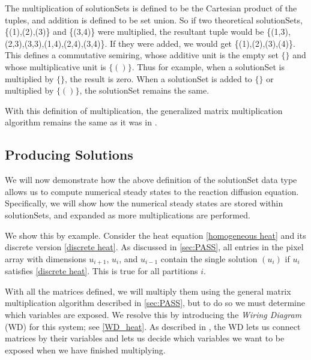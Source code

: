 \documentclass[11pt]{article}
\begin{document}
The multiplication of solutionSets is defined to be the Cartesian product of the tuples, and addition is defined to be set union. So if two theoretical solutionSets, \{(1),(2),(3)\} and \{(3,4)\} were multiplied, the resultant tuple would be \{(1,3),(2,3),(3,3),(1,4),(2,4),(3,4)\}. If they were added, we would get \{(1),(2),(3),(4)\}. This defines a commutative semiring, whose additive unit is the empty set $\{\}$ and whose multiplicative unit is $\{()\}$. Thus for example, when a solutionSet is multiplied by $\{\}$, the result is zero. When a solutionSet is added to $\{\}$ or multiplied by $\{()\}$, the solutionSet remains the same.

With this definition of multiplication, the generalized matrix multiplication algorithm remains the same as it was in \citep{Introduction_to_PA}.

\subsection{Producing Solutions}

We will now demonstrate how the above definition of the solutionSet data type allows us to compute numerical steady states to the reaction diffusion equation. Specifically, we will show how the numerical steady states are stored within solutionSets, and expanded as more multiplications are performed. 

We show this by example. Consider the heat equation \eqref{homogeneous heat} and its discrete version \eqref{discrete heat}. As discussed in \cref{sec:PASS}, all entries in the pixel array with dimensions $u_{i+1}$, $u_i$, and $u_{i-1}$ contain the single solution ${(u_i)}$ if $u_i$ satisfies \cref{discrete heat}. This is true for all partitions $i$.

With all the matrices defined, we will multiply them using the general matrix multiplication algorithm described in \cref{sec:PASS}, but to do so we must determine which variables are exposed. We resolve this by introducing the \textit{Wiring Diagram} (WD) for this system; see \cref{WD_heat}. As described in \citep{Introduction_to_PA}, the WD lets us connect matrices by their variables and lets us decide which variables we want to be exposed when we have finished multiplying.
\end{document}
